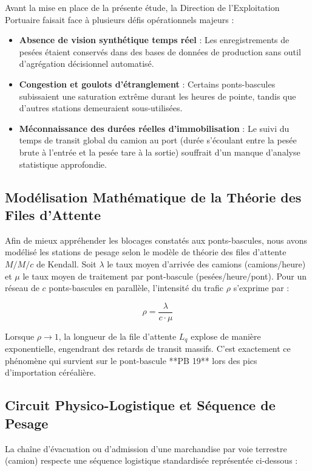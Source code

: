 \documentclass[12pt,a4paper,oneside]{report}
\begin{document}
Avant la mise en place de la présente étude, la Direction de l'Exploitation Portuaire faisait face à plusieurs défis opérationnels majeurs :
\begin{itemize}
    \item \textbf{Absence de vision synthétique temps réel} : Les enregistrements de pesées étaient conservés dans des bases de données de production sans outil d'agrégation décisionnel automatisé.
    \item \textbf{Congestion et goulots d'étranglement} : Certains ponts-bascules subissaient une saturation extrême durant les heures de pointe, tandis que d'autres stations demeuraient sous-utilisées.
    \item \textbf{Méconnaissance des durées réelles d'immobilisation} : Le suivi du temps de transit global du camion au port (durée s'écoulant entre la pesée brute à l'entrée et la pesée tare à la sortie) souffrait d'un manque d'analyse statistique approfondie.
\end{itemize}

\subsection{Modélisation Mathématique de la Théorie des Files d'Attente}
Afin de mieux appréhender les blocages constatés aux ponts-bascules, nous avons modélisé les stations de pesage selon le modèle de théorie des files d'attente $M/M/c$ de Kendall.
Soit $\lambda$ le taux moyen d'arrivée des camions (camions/heure) et $\mu$ le taux moyen de traitement par pont-bascule (pesées/heure/pont). Pour un réseau de $c$ ponts-bascules en parallèle, l'intensité du trafic $\rho$ s'exprime par :

\begin{equation}
\rho = \frac{\lambda}{c \cdot \mu}
\end{equation}

Lorsque $\rho \to 1$, la longueur de la file d'attente $L_q$ explose de manière exponentielle, engendrant des retards de transit massifs. C'est exactement ce phénomène qui survient sur le pont-bascule **PB 19** lors des pics d'importation céréalière.

\subsection{Circuit Physico-Logistique et Séquence de Pesage}
La chaîne d'évacuation ou d'admission d'une marchandise par voie terrestre (camion) respecte une séquence logistique standardisée représentée ci-dessous :
\end{document}
